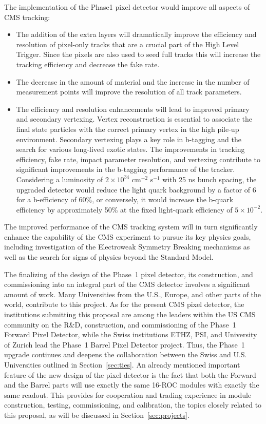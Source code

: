 The implementation of the Phase1 pixel detector would improve all aspects of CMS tracking:
\begin{itemize}
\item The addition of the extra layers will dramatically improve the
  efficiency and resolution of pixel-only tracks that are a crucial
  part of the High Level Trigger. Since the pixels are also used to seed full tracks
  this will increase the tracking efficiency and decrease the fake
  rate.
\item The decrease in the amount of material and the increase in the
  number of measurement points will improve the resolution of all
  track parameters.
\item The efficiency and resolution enhancements will lead to improved
  primary and secondary vertexing. Vertex reconstruction is essential
  to associate the final state particles with the correct primary
  vertex in the high pile-up environment. Secondary vertexing plays a
  key role in b-tagging and the search for various long-lived exotic
  states. The improvements in tracking efficiency, fake rate, impact
  parameter resolution, and vertexing contribute to significant
  improvements in the b-tagging performance of the tracker.
  Considering a luminosity of $2 \times 10^{34}$ cm$^{-2}$ s$^{-1}$
  with 25 ns bunch spacing, the upgraded detector would reduce the
  light quark background by a factor of 6 for a b-efficiency of 60\%,
  or conversely, it would increase the b-quark efficiency by
  approximately 50\% at the fixed light-quark efficiency of $5\times
  10^{-2}$.
\end{itemize}

\noindent
The improved performance of the CMS tracking system will in turn
significantly enhance the capability of the CMS experiment to pursue
its key physics goals, including investigation of the Electroweak
Symmetry Breaking mechanisms as well as the search for signs of
physics beyond the Standard Model.

The finalizing of the design of the Phase~1 pixel detector, its
construction, and commissioning into an integral part of the CMS
detector involves a significant amount of work. Many Universities from
the U.S., Europe, and other parts of the world, contribute to this
project. As for the present CMS pixel detector, the institutions
submitting this proposal are among the leaders within the US CMS
community on the R\&D, construction, and commissioning of the Phase~1
Forward Pixel Detector, while the Swiss institutions ETHZ, PSI, and
University of Zurich lead the Phase~1 Barrel Pixel Detector project.
Thus, the Phase~1 upgrade continues and deepens the collaboration between
the Swiss and U.S. Universities outlined in Section~\ref{sec:ties}.
An already mentioned important feature of the new design of the pixel
detector is the fact that both the Forward and the Barrel parts will
use exactly the same 16-ROC modules with exactly the same readout.
This provides for cooperation and trading experience in module
construction, testing, commissioning, and calibration, the topics
closely related to this proposal, as will be discussed in
Section~\ref{sec:projects}.


